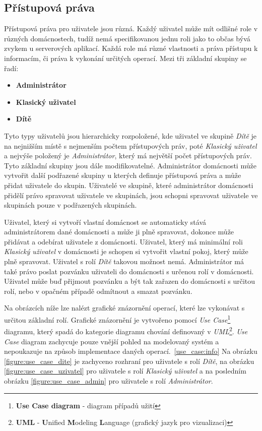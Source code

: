 \subsection*{Přístupová práva}
\label{backend:prava}
Přístupová práva pro uživatele jsou různá. Každý uživatel může mít odlišné role v různých domácnostech, tudíž nemá specifikovanou jednu roli jako to občas bývá zvykem u serverových aplikací.
Každá role má různé vlastnosti a práva přístupu k informacím, či práva k vykonání určitých operací.
\newline
Mezi tři základní skupiny se řadí:
\begin{itemize}
  \item \textbf{Administrátor}
  \item \textbf{Klasický uživatel}
  \item \textbf{Dítě}
\end{itemize}

Tyto typy uživatelů jsou hierarchicky rozpoložené, kde uživatel ve skupině \emph{Dítě} je na nejnižším místě s nejmenším počtem přístupových práv, poté \emph{Klasický uživatel} a nejvýše položený je \emph{Administrátor}, který má největší počet přístupových práv.
Tyto základní skupiny jsou dále modifikovatelné. Administrátor domácnosti může vytvořit další podřazené skupiny u kterých definuje přístupová práva a může přidat uživatele do skupin.
Uživatelé ve skupině, které administrátor domácnosti přidělí právo spravovat uživatele ve skupinách, jsou schopni spravovat uživatele ve skupinách pouze v podřazených skupinách.

Uživatel, který si vytvoří vlastní domácnost se automaticky stává administrátorem dané domácnosti a může ji plně spravovat, dokonce může přidávat a odebírat uživatele z domácnosti.
Uživatel, který má minimální roli \emph{Klasický uživatel} v domácnosti je schopen si vytvořit vlastní pokoj, který může plně spravovat. Uživatel s rolí \emph{Dítě} takovou možnost nemá.
Administrátor má také právo poslat pozvánku uživateli do domácnosti s určenou rolí v domácnosti. Uživatel může buď přijmout pozvánku a být tak zařazen do domácnosti s určitou rolí, nebo v opačném případě odmítnout a smazat pozvánku.
\newline

Na obrázcích níže lze nalézt grafické znázornění operací, které lze vykonávat s určitou základní rolí.
Grafické znázornění je vytvořeno pomocí \emph{Use Case}\footnote{\textbf{Use Case diagram} - diagram případů užití} diagramu, který spadá do kategorie diagramu chování definovaný v \emph{UML}\footnote{\textbf{UML} - \textbf{U}nified \textbf{M}odeling \textbf{L}anguage (grafický jazyk pro vizualizaci)}.
\emph{Use Case} diagram zachycuje pouze vnější pohled na modelovaný systém a nepoukazuje na způsob implementace daných operací.~\ref{use_case:info}
Na obrázku \ref{figure:use_case_dite} je zachyceno rozhraní pro uživatele s rolí \emph{Dítě}, na obrázku \ref{figure:use_case_uzivatel} pro uživatele s rolí \emph{Klasický uživatel} a na posledním obrázku \ref{figure:use_case_admin} pro uživatele s rolí \emph{Administrátor}.

